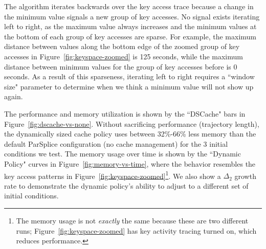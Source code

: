The algorithm iterates backwards over the key access trace because a change in
the minimum value signals a new group of key accesses. No signal exists
iterating left to right, as the maximum value always increases and the minimum
values at the bottom of each group of key accesses are sparse.  For example,
the maximum distance between values along the bottom edge of the zoomed group
of key accesses in Figure~\ref{fig:keyspace-zoomed} is 125 seconds, while the
maximum distance between minimum values for the group of key accesses before is
0 seconds. As a result of this sparseness, iterating left to right requires a
``window size" parameter to determine when we think a minimum value will not
show up again.  

The performance and memory utilization is shown by the ``DSCache" bars in
Figure~\ref{fig:dscache-vs-none}. Without sacrificing performance (trajectory
length), the dynamically sized cache policy uses between 32\%-66\% less memory
than the default ParSplice configuration (no cache management) for the 3
initial conditions we test. The memory usage over time is shown by the ``Dynamic Policy"
curves in Figure~\ref{fig:memory-vs-time}, where the behavior resembles the key
access patterns in Figure~\ref{fig:keyspace-zoomed}\footnote{The memory usage
is not {\it exactly} the same because these are two different runs;
Figure~\ref{fig:keyspace-zoomed} has key activity tracing turned on, which
reduces performance.}.  We also show a \(\Delta_2\) growth rate to demonstrate
the dynamic policy's ability to adjust to a different set of initial
conditions.


